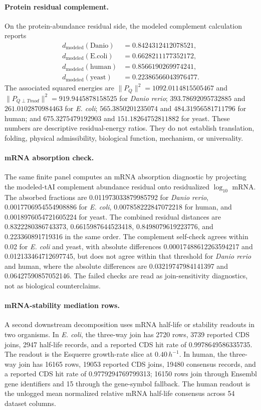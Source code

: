 \paragraph{Protein residual complement.}
On the protein-abundance residual side, the modeled complement calculation reports
$$
\begin{aligned}
 d_{\mathrm{modeled}}(\mathrm{Danio}) &= 0.8424312412078521,\\
 d_{\mathrm{modeled}}(\mathrm{E.coli}) &= 0.6628211177352172,\\
 d_{\mathrm{modeled}}(\mathrm{human}) &= 0.8566190269974241,\\
 d_{\mathrm{modeled}}(\mathrm{yeast}) &= 0.22386566043976477.
\end{aligned}
$$
The associated squared energies are $\|P_Q\|^2=1092.0114815505467$ and $\|P_{Q\perp Tmod}\|^2=919.9445878158525$ for \emph{Danio rerio}; $393.78692095732885$ and $261.0102870984463$ for \emph{E. coli}; $565.3850201235074$ and $484.31956581711796$ for human; and $675.3275479192903$ and $151.18264752811882$ for yeast. These numbers are descriptive residual-energy ratios. They do not establish translation, folding, physical admissibility, biological function, mechanism, or universality.

\paragraph{mRNA absorption check.}
The same finite panel computes an mRNA absorption diagnostic by projecting the modeled-tAI complement abundance residual onto residualized $\log_{10}$ mRNA. The absorbed fractions are 0.011973033879985792 for \emph{Danio rerio}, 0.0017706954554908886 for \emph{E. coli}, 0.007858222847072218 for human, and 0.0018976054721605224 for yeast. The combined residual distances are 0.8322280386743373, 0.6615987644523418, 0.8498079619223776, and 0.223360891719316 in the same order. The complement self-check agrees within 0.02 for \emph{E. coli} and yeast, with absolute differences 0.00017488612263594217 and 0.012133464712697745, but does not agree within that threshold for \emph{Danio rerio} and human, where the absolute differences are 0.03219747984141397 and 0.06427590857052146. The failed checks are read as join-sensitivity diagnostics, not as biological counterclaims.

\paragraph{mRNA-stability mediation rows.}
A second downstream decomposition uses mRNA half-life or stability readouts in two organisms. In \emph{E. coli}, the three-way join has 2720 rows, 3739 reported CDS joins, 2947 half-life records, and a reported CDS hit rate of 0.9978649586335735. The readout is the Esquerre growth-rate slice at $0.40\,h^{-1}$. In human, the three-way join has 16165 rows, 19053 reported CDS joins, 19480 consensus records, and a reported CDS hit rate of 0.9779294769799313; 16150 rows join through Ensembl gene identifiers and 15 through the gene-symbol fallback. The human readout is the unlogged mean normalized relative mRNA half-life consensus across 54 dataset columns.

